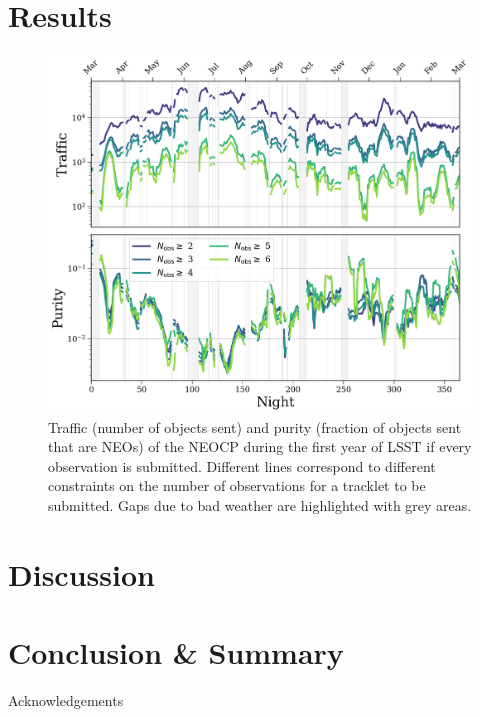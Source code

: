 \documentclass[twocolumn, twocolappendix]{aastex631}
\begin{document}
\section{Results} \label{sec:results}
\begin{figure}
    \centering
    \includegraphics[width=\textwidth]{scary.png}
    \caption{Traffic (number of objects sent) and purity (fraction of objects sent that are NEOs) of the NEOCP during the first year of LSST if every observation is submitted. Different lines correspond to different constraints on the number of observations for a tracklet to be submitted. Gaps due to bad weather are highlighted with grey  areas.}
\end{figure}

\section{Discussion} \label{sec:discussion}

\section{Conclusion \& Summary} \label{sec:conclusion}

\begin{acknowledgements}
    Acknowledgements
\end{acknowledgements}



{}


% 
\end{document}
